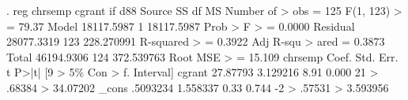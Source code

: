. reg chrsemp cgrant if d88
{\smallskip}
      Source {\VBAR}       SS           df       MS      Number of
>  obs   =       125
   F(1, 123)
>        =     79.37
       Model {\VBAR}  18117.5987         1  18117.5987   Prob > F 
>        =    0.0000
    Residual {\VBAR}  28077.3319       123  228.270991   R-squared
>        =    0.3922
   Adj R-squ
> ared   =    0.3873
       Total {\VBAR}  46194.9306       124  372.539763   Root MSE 
>        =    15.109
{\smallskip}
     chrsemp {\VBAR}      Coef.   Std. Err.      t    P>|t|     [9
> 5\% Con                                                    
>       f. Interval]
      cgrant {\VBAR}   27.87793   3.129216     8.91   0.000     21
> .68384                                                    
>           34.07202
       _cons {\VBAR}   .5093234   1.558337     0.33   0.744     -2
> .57531                                                    
>           3.593956
{\smallskip}
